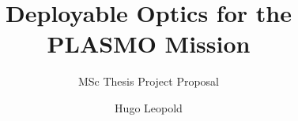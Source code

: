 \documentclass{tudelft-report}
\begin{document}
\frontmatter

\title{Deployable Optics for the PLASMO Mission}
\subtitle{MSc Thesis Project Proposal}
\subject{Deployable secondary-mirror structure for a VLEO plastic-monitoring instrument} %
\author{Hugo Leopold}


\makecover



%
%

\tableofcontents

%


\mainmatter








\setcounter{biburlnumpenalty}{7000}
\setcounter{biburllcpenalty}{7000}
\setcounter{biburlucpenalty}{7000}

\printbibliography[heading=bibintoc,title=References]


%
%
\end{document}
